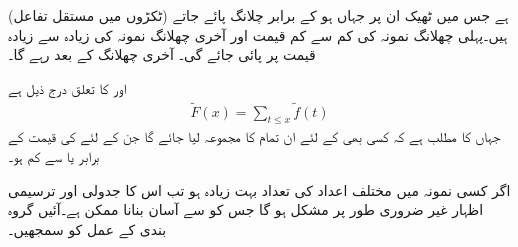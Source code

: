   (ٹکڑوں میں مستقل تفاعل) ہے جس میں ٹھیک ان   پر جہاں  ہو  کے برابر چلانگ پائے جاتے ہیں۔پہلی چھلانگ نمونہ کی کم سے کم قیمت اور آخری چھلانگ نمونہ کی زیادہ سے زیادہ قیمت پر پائی جائے گی۔ آخری چھلانگ  کے بعد  رہے گا۔

 اور  کا تعلق درج ذیل ہے
\begin{align}
\tilde{F}(x)=\sum_{t\le x}\tilde{f}(t)
\end{align}
جہاں  کا مطلب  ہے کہ کسی بھی  کے لئے ان تمام  کا مجموعہ لیا جائے گا جن کے لئے  کی قیمت  کے برابر یا  سے کم ہو۔

اگر کسی نمونہ میں مختلف اعداد کی تعداد بہت زیادہ ہو تب اس کا جدولی اور ترسیمی  اظہار غیر ضروری طور پر مشکل ہو گا جس کو  سے آسان بنانا ممکن ہے۔آئیں گروہ بندی کے عمل کو سمجھیں۔


